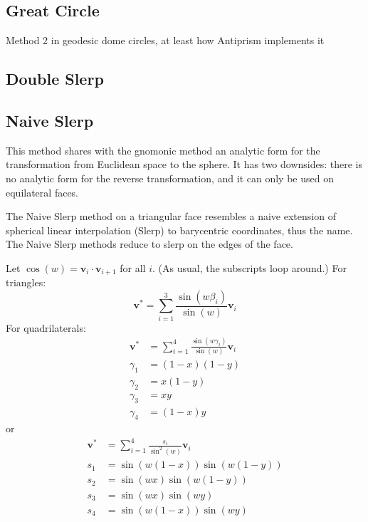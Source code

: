 \documentclass{amsart}[12pt]
\begin{document}
\subsection{Great Circle}
Method 2 in geodesic dome circles, at least how Antiprism implements it
\subsection{Double Slerp}

\subsection{Naive Slerp}
This method shares with the gnomonic method an analytic form for the
transformation from Euclidean space to the sphere. It has two downsides: there is no analytic form
for the reverse transformation, and it can only be used on equilateral faces.

The Naive Slerp method on a triangular face resembles a naive extension of
spherical linear interpolation (Slerp) to barycentric coordinates, thus the
name. The Naive Slerp methods reduce to slerp on the edges of the face.

Let $\cos(w) = \mathbf v_i \cdot \mathbf v_{i+1}$ for all $i$. (As
usual, the subscripts loop around.) For triangles:
\begin{equation}
   \mathbf v^* = \sum_{i=1}^3\frac{\sin(w\beta_i)}{\sin(w)}  \mathbf v_i
\end{equation}
For quadrilaterals:
\begin{equation}\begin{split}
     \mathbf v^* & = \sum_{i=1}^4\frac{\sin(w\gamma_i)}{\sin(w)} \mathbf v_i \\
\gamma_1 & = (1-x)(1-y) \\
\gamma_2 & = x(1-y) \\
\gamma_3 & = xy \\
\gamma_4 & = (1-x)y
\end{split}\end{equation}
or
\begin{equation}\begin{split}
   \mathbf v^* & = \sum_{i=1}^4\frac{s_i}{\sin^2(w)}  \mathbf v_i \\
s_1 &  = \sin (w(1-x))\sin (w(1-y)) \\
s_2 & = \sin (wx)\sin (w(1-y)) \\
s_3 & = \sin (wx)\sin (wy) \\
s_4 & = \sin (w(1-x))\sin (wy)
\end{split}\end{equation}
\end{document}

